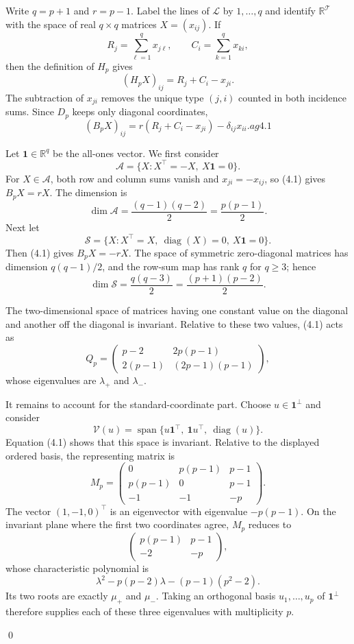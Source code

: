 \documentclass[12pt]{article}
\renewenvironment{proof}{{\bf \noindent Proof.}}{\qed}
\theoremstyle{definition}
\newcommand{\calL}{\mathcal{L}}
\newcommand{\calT}{\mathcal{T}}
\newcommand{\one}{\mathbf{1}}
\begin{document}
	\begin{proof}
		Write $q=p+1$ and $r=p-1$. Label the lines of $\calL$ by $1,\ldots,q$ and identify $\mathbb R^{\calT}$ with the space of real $q\times q$ matrices $X=(x_{ij})$. If
		$$
		R_j=\sum_{\ell=1}^q x_{j\ell},
		\qquad
		C_i=\sum_{k=1}^q x_{ki},
		$$
		then the definition of $H_p$ gives
		$$
		(H_pX)_{ij}=R_j+C_i-x_{ji}.
		$$
		The subtraction of $x_{ji}$ removes the unique type $(j,i)$ counted in both incidence sums. Since $D_p$ keeps only diagonal coordinates,
		$$
		(B_pX)_{ij}=r(R_j+C_i-x_{ji})-\delta_{ij}x_{ii}.
		ag{4.1}
		$$
		
		Let $\one\in\mathbb R^q$ be the all-ones vector. We first consider
		$$
		\mathscr A=\{X:X^{\top}=-X,\ X\one=0\}.
		$$
		For $X\in\mathscr A$, both row and column sums vanish and $x_{ji}=-x_{ij}$, so (4.1) gives $B_pX=rX$. The dimension is
		$$
		\dim\mathscr A=\frac{(q-1)(q-2)}{2}=\frac{p(p-1)}{2}.
		$$
		Next let
		$$
		\mathscr S=\{X:X^{\top}=X,\ \operatorname{diag}(X)=0,\ X\one=0\}.
		$$
		Then (4.1) gives $B_pX=-rX$. The space of symmetric zero-diagonal matrices has dimension $q(q-1)/2$, and the row-sum map has rank $q$ for $q\ge3$; hence
		$$
		\dim\mathscr S=\frac{q(q-3)}{2}=\frac{(p+1)(p-2)}{2}.
		$$
		
		The two-dimensional space of matrices having one constant value on the diagonal and another off the diagonal is invariant. Relative to these two values, (4.1) acts as
		$$
		Q_p=
		\begin{pmatrix}
			p-2&2p(p-1)\\
			2(p-1)&(2p-1)(p-1)
		\end{pmatrix},
		$$
		whose eigenvalues are $\lambda_+$ and $\lambda_-$.
		
		It remains to account for the standard-coordinate part. Choose $u\in\one^{\perp}$ and consider
		$$
		\mathscr V(u)=\operatorname{span}\{u\one^{\top},\ \one u^{\top},\ \operatorname{diag}(u)\}.
		$$
		Equation (4.1) shows that this space is invariant. Relative to the displayed ordered basis, the representing matrix is
		$$
		M_p=
		\begin{pmatrix}
			0&p(p-1)&p-1\\
			p(p-1)&0&p-1\\
			-1&-1&-p
		\end{pmatrix}.
		$$
		The vector $(1,-1,0)^{\top}$ is an eigenvector with eigenvalue $-p(p-1)$. On the invariant plane where the first two coordinates agree, $M_p$ reduces to
		$$
		\begin{pmatrix}
			p(p-1)&p-1\\
			-2&-p
		\end{pmatrix},
		$$
		whose characteristic polynomial is
		$$
		\lambda^2-p(p-2)\lambda-(p-1)(p^2-2).
		$$
		Its two roots are exactly $\mu_+$ and $\mu_-$. Taking an orthogonal basis $u_1,\ldots,u_p$ of $\one^{\perp}$ therefore supplies each of these three eigenvalues with multiplicity $p$.
		

\end{proof}
\end{document}
